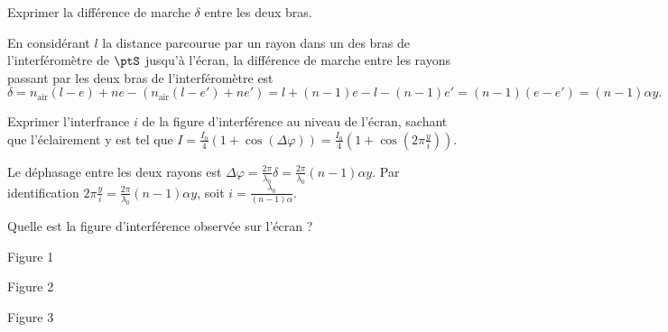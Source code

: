 \begin{enonce}
Exprimer la différence de marche $\delta$ entre les deux bras. 
\end{enonce}


\begin{corrige}
	En considérant $l$ la distance parcourue par un rayon dans un des bras de l'interféromètre de $\ptS$ jusqu'à l'écran, la différence de marche entre les rayons passant par les deux bras de l'interféromètre est
	$$
	\delta = n_{\text{air}}\left( l - e \right) + ne - \left( n_{\text{air}}\left( l - e' \right) + ne' \right) = l + \left( n - 1 \right)e -  l - \left( n - 1 \right)e'  = \left( n - 1 \right)\left( e - e' \right)  = \left( n - 1 \right)\alpha y.
	$$
\end{corrige}




\begin{enonce}
Exprimer l'interfrance $i$ de la figure d'interférence au niveau de l'écran, sachant que l'éclairement y est tel que $I = \frac{I_0}{4}\left( 1 + \cos\left(  \Delta \varphi \right) \right) = \frac{I_0}{4}\left( 1 + \cos\left(  2\pi\frac{y}{i} \right) \right)$.
\end{enonce}


\begin{corrige}
Le déphasage entre les deux rayons est $
\Delta \varphi = \frac{2\pi}{\lambda_0}\delta = \frac{2\pi}{\lambda_0}\left( n - 1 \right)\alpha y
$.
Par identification $2\pi\frac{y}{i} = \frac{2\pi}{\lambda_0}\left( n - 1 \right)\alpha y$, soit $i = \frac{\lambda_0}{\left( n-1 \right)\alpha}$.
\end{corrige}




\begin{enonce}
	Quelle est la figure d'interférence observée sur l'écran ?
	\begin{listeQCM3Colonnes}
		\item Figure 1
		\item Figure 2
		\item Figure 3
		\end{listeQCM3Colonnes}
\end{enonce}
	
